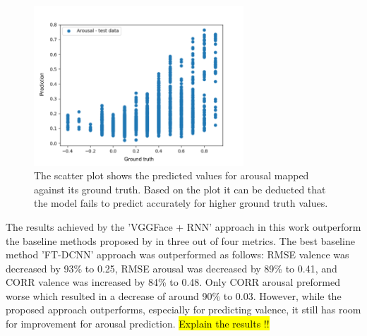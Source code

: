 \begin{figure}[htbp]
  \centering
  \includegraphics[width=0.7\textwidth]{Figures/ScatterPlot_Arousal.png}
  \caption[Scatter plot for arousal with the proposed approach]{The scatter plot shows the predicted values for arousal mapped against its ground truth. Based on the plot it can be deducted that the model fails to predict accurately for higher ground truth values.}
  \label{fig:ScatterPlotArousal}
\end{figure}

\noindent The results achieved by the 'VGGFace + RNN' approach in this work outperform the baseline methods proposed by \citet{Kossaifi:2017:AFEW-VADatabase} in three out of four metrics. The best baseline method 'FT-DCNN' \citep{Kossaifi:2017:AFEW-VADatabase} approach was outperformed as follows: RMSE valence was decreased by 93\% to 0.25, RMSE arousal was decreased by 89\% to 0.41, and CORR valence was increased by 84\% to 0.48. Only CORR arousal preformed worse which resulted in a decrease of around 90\% to 0.03. However, while the proposed approach outperforms, especially for predicting valence, it still has room for improvement for arousal prediction.  \hl{Explain the results !!}

